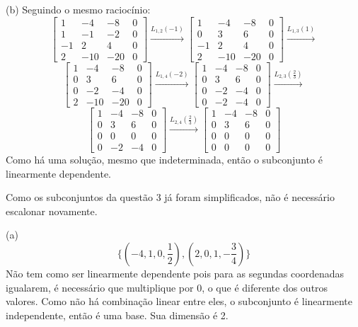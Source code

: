 \documentclass{homework}
\begin{document}
(b) Seguindo o mesmo raciocínio:
\[
\left[ \begin{array}{ccc|c}
1 & -4 & -8 & 0\\
1 & -1 & -2 & 0\\
-1 & 2 & 4 & 0\\
2 & -10 & -20 & 0
\end{array} \right] \xrightarrow{L_{1,2}(-1)}
\left[ \begin{array}{ccc|c}
1 & -4 & -8 & 0\\
0 & 3 & 6 & 0\\
-1 & 2 & 4 & 0\\
2 & -10 & -20 & 0
\end{array} \right] \xrightarrow{L_{1,3}(1)}
\]
\[
\left[ \begin{array}{ccc|c}
1 & -4 & -8 & 0\\
0 & 3 & 6 & 0\\
0 & -2 & -4 & 0\\
2 & -10 & -20 & 0
\end{array} \right] \xrightarrow{L_{1,4}(-2)}
\left[ \begin{array}{ccc|c}
1 & -4 & -8 & 0\\
0 & 3 & 6 & 0\\
0 & -2 & -4 & 0\\
0 & -2 & -4 & 0
\end{array} \right] \xrightarrow{L_{2,3}(\frac{2}{3})}
\]
\[
\left[ \begin{array}{ccc|c}
1 & -4 & -8 & 0\\
0 & 3 & 6 & 0\\
0 & 0 & 0 & 0\\
0 & -2 & -4 & 0
\end{array} \right] \xrightarrow{L_{2,4}(\frac{2}{3})}
\left[ \begin{array}{ccc|c}
1 & -4 & -8 & 0\\
0 & 3 & 6 & 0\\
0 & 0 & 0 & 0\\
0 & 0 & 0 & 0
\end{array} \right]
\]
Como há uma solução, mesmo que indeterminada, então o subconjunto é linearmente dependente.

\exercise*
Como os subconjuntos da questão 3 já foram simplificados, não é necessário escalonar novamente.

(a)
\[\{(-4,1,0,\frac{1}{2}),(2,0,1,-\frac{3}{4})\}\]
Não tem como ser linearmente dependente pois para as segundas coordenadas igualarem, é necessário que multiplique por 0, o que é diferente dos outros valores. Como não há combinação linear entre eles, o subconjunto é linearmente independente, então é uma base. Sua dimensão é 2.
\end{document}
